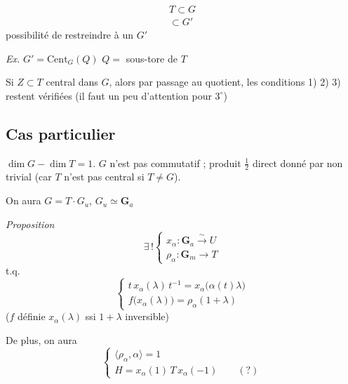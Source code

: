 \documentclass[11pt,a4paper]{article}
\begin{document}

\[
  \begin{array}{c}
    T \subset G \\
    \subset G'
  \end{array}
\]
possibilité de restreindre à un $G'$

\emph{Ex.} $G' = \mathrm{Cent}_G(Q)$ \qquad $Q =$ sous-tore de $T$


Si $Z \subset T$ central dans $G$, alors \ill{} par passage au quotient, les
conditions 1) 2) 3) restent vérifiées (il faut un peu d'attention pour
$3^{\circ}$)

\subsection*{Cas particulier}

$\dim G - \dim T = 1$. $G$ n'est pas commutatif ; produit $\frac{1}{2}$ direct
donné par \ill{} non trivial (car $T$ n'est pas central si $T \neq G$).

On aura $G = T \cdot G_u$, $G_u \simeq \mathbf{G}_a$

\emph{Proposition}
\[
  \exists\,!
  \left\{
  \begin{array}{l}
    x_\alpha : \mathbf{G}_a \xrightarrow{\ \sim\ } U \\
    \rho_\alpha : \mathbf{G}_m \longrightarrow T
  \end{array}
  \right.
\]
t.q.
\[
  \left\{
  \begin{array}{l}
    t\,x_\alpha(\lambda)\,t^{-1} = x_\alpha\bigl(\alpha(t)\lambda\bigr) \\
    f\bigl(x_\alpha(\lambda)\bigr) = \rho_\alpha(1+\lambda)
  \end{array}
  \right.
\]
($f$ définie \ill{} $x_\alpha(\lambda)$ ssi $1+\lambda$ inversible)

De plus, on aura
\[
  \left\{
  \begin{array}{l}
    \langle \rho_\alpha, \alpha \rangle = 1 \\
    H = x_\alpha(1)\,T\,x_\alpha(-1) \qquad (?)
  \end{array}
  \right.
\]
\end{document}
